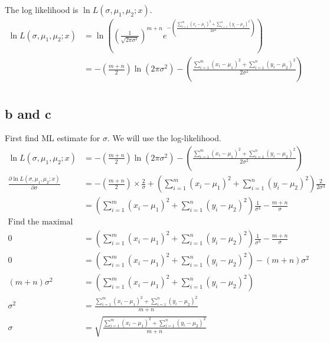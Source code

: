 \documentclass{article}
\begin{document}
The log likelihood is $\ln L(\sigma, \mu_1, \mu_2;x)$.
\begin{align*}
    \ln L(\sigma, \mu_1, \mu_2;x) &= \ln \left({{\left(\frac{1}{\sqrt{2\pi\sigma^2}}\right)}^{m+n}
    e^{-\left(\frac{\sum_{i=1}^m {(x_i-\mu_1)}^2 + \sum_{i=1}^n {(y_i-\mu_2)}^2}
    {2\sigma^2}\right)}}\right) \\
    &= -\left(\frac{m+n}{2}\right) \ln\left(2\pi\sigma^2\right)
    -\left(\frac{\sum_{i=1}^m {(x_i-\mu_1)}^2 + \sum_{i=1}^n {(y_i-\mu_2)}^2}
    {2\sigma^2}\right) \\
\end{align*}

\subsection{b and c}
First find ML estimate for $\sigma$. We will use the log-likelihood.
\begin{align*}
    \ln L(\sigma, \mu_1, \mu_2;x) &= -\left(\frac{m+n}{2}\right) \ln\left(2\pi\sigma^2\right)
    -\left(\frac{\sum_{i=1}^m {(x_i-\mu_1)}^2 + \sum_{i=1}^n {(y_i-\mu_2)}^2}
    {2\sigma^2}\right) \\
    \frac{\partial \ln L(\sigma, \mu_1, \mu_2;x)}{\partial \sigma}
    &= -\left(\frac{m+n}{2}\right) \times \frac{2}{\sigma}
    + \left(\sum_{i=1}^m {(x_i-\mu_1)}^2 + \sum_{i=1}^n {(y_i-\mu_2)}^2\right)
    \frac{2}{2\sigma^3} \\
    &= \left(\sum_{i=1}^m {(x_i-\mu_1)}^2 + \sum_{i=1}^n {(y_i-\mu_2)}^2\right)
    \frac{1}{\sigma^3}
    - \frac{m+n}{\sigma} \\
    \text{Find the maximal point} \\
    0 &= \left(\sum_{i=1}^m {(x_i-\mu_1)}^2 + \sum_{i=1}^n {(y_i-\mu_2)}^2\right)
    \frac{1}{\sigma^3}
    - \frac{m+n}{\sigma} \\
    0 &= \left(\sum_{i=1}^m {(x_i-\mu_1)}^2 + \sum_{i=1}^n {(y_i-\mu_2)}^2\right)
    - {(m+n)}{\sigma^2} \\
    (m+n)\sigma^2 &= \left(\sum_{i=1}^m {(x_i-\mu_1)}^2 + \sum_{i=1}^n {(y_i-\mu_2)}^2\right) \\
    \sigma^2 &= \frac{\sum_{i=1}^m {(x_i-\mu_1)}^2 + \sum_{i=1}^n {(y_i-\mu_2)}^2}{m+n} \\
    \sigma &= \sqrt{\frac{\sum_{i=1}^m {(x_i-\mu_1)}^2 + \sum_{i=1}^n {(y_i-\mu_2)}^2}{m+n}} \\
\end{align*}
\end{document}
